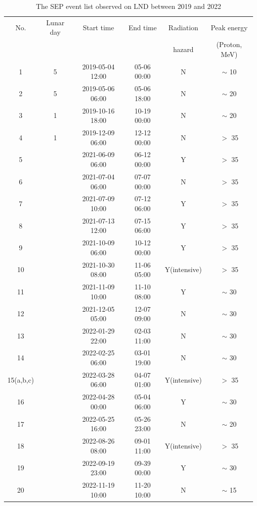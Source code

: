 \begin{table}[!h]
    \centering
    \caption[The SEP event list observed on LND]{The SEP event list observed on LND between 2019 and 2022}
\begin{tabular}{cccccc}
    \hline
    No.     & Lunar day & Start time    & End time      & Radiation  & Peak energy \\
            &           &               &               & hazard      & (Proton, MeV)\\
    \hline
    1       & 5         &  2019-05-04 12:00 & 05-06 00:00               & N  & $\sim$ 10\\
    2       & 5         &  2019-05-06 06:00 & 05-06 18:00              & N  & $\sim$ 20 \\
    3       & 1         &  2019-10-16 18:00 & 10-19 00:00             & N  & $\sim$ 20 \\
    4       & 1         &  2019-12-09 06:00 & 12-12 00:00             & N  & $>$ 35 \\    
    5       &           &  2021-06-09 06:00 & 06-12 00:00             & Y  & $>$ 35 \\
    6       &           &  2021-07-04 06:00 & 07-07 00:00             & N  & $>$ 35 \\
    7       &           &  2021-07-09 10:00 & 07-12 06:00             & Y  & $>$ 35 \\
    8       &           &  2021-07-13 12:00 & 07-15 06:00             & Y  & $>$ 35 \\
    9       &           &  2021-10-09 06:00 & 10-12 00:00             & Y  & $>$ 35 \\
    10      &           &  2021-10-30 08:00 & 11-06 05:00             & Y(intensive)  & $>$ 35\\
    11      &           &  2021-11-09 10:00 & 11-10 08:00             & Y  & $\sim$ 30 \\
    12      &           &  2021-12-05 05:00 & 12-07 09:00             & N  & $\sim$ 30 \\
    13      &           &  2022-01-29 22:00 & 02-03 11:00             & N  & $\sim$ 30 \\
    14      &           &  2022-02-25 06:00 & 03-01 19:00             & N  & $\sim$ 30 \\
    15(a,b,c)      &           &  2022-03-28 06:00 & 04-07 01:00             & Y(intensive)  & $>$ 35 \\
    16     &           &  2022-04-28 00:00 & 05-04 06:00             & Y  & $\sim$ 30 \\
    17      &           &  2022-05-25 16:00 & 05-26 23:00             & N  & $\sim$ 20\\
    18      &           &  2022-08-26 08:00 & 09-01 11:00             & Y(intensive)  & $>$ 35 \\
    19      &           &  2022-09-19 23:00 & 09-39 00:00             & Y  & $\sim$ 30 \\
    20      &           &  2022-11-19 10:00 & 11-20 10:00             & N  & $\sim$ 15 \\
    \hline
\end{tabular}
\label{Tab:appendix_LND_SEP_list}
\end{table}

